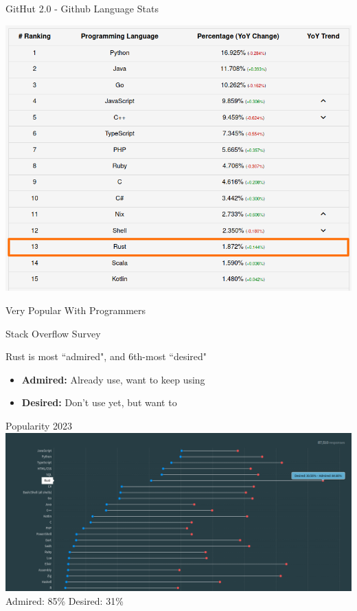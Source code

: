 \documentclass{beamer}
\begin{document}
\begin{frame}{GitHut 2.0 - Github Language Stats } 
\begin{center}
\includegraphics[scale=0.4]{githut-statistics}
\end{center}
\end{frame} 


\begin{frame}{Very Popular With Programmers} 

	\begin{block}{Stack Overflow Survey}

   	Rust is most ``admired", and 6th-most ``desired"

   \end{block}


    \begin{itemize}
    \item \textbf{Admired:} Already use, want to keep using
    \item \textbf{Desired:} Don't use yet, but want to
    \end{itemize} 
    
\end{frame} 

\begin{frame}{Popularity 2023} 
\includegraphics[scale=0.2]{desired-admired-2023}
Admired: 85\%
Desired: 31\%\\
\end{frame} 
\end{document}
